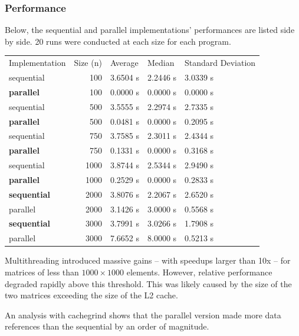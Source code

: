 \documentclass{article}
\begin{document}
\subsubsection{Performance}
Below, the sequential and parallel implementations' performances are
listed side by side. 20 runs were conducted at each size for each program.
\begin{center}
\begin{tabular}{lrlll}
 Implementation  &  Size (n)  &  Average   &  Median    &  Standard Deviation  \\
 sequential       &       100  &  3.6504 s  &  2.2446 s  &  3.0339 s            \\
 \textbf{parallel}       &       100  &  0.0000 s  &  0.0000 s  &  0.0000 s            \\
 sequential       &       500  &  3.5555 s  &  2.2974 s  &  2.7335 s            \\
\textbf{parallel}      &       500  &  0.0481 s  &  0.0000 s  &  0.2095 s            \\
 sequential       &       750  &  3.7585 s  &  2.3011 s  &  2.4344 s            \\
 \textbf{parallel}       &       750  &  0.1331 s  &  0.0000 s  &  0.3168 s            \\
 sequential       &      1000  &  3.8744 s  &  2.5344 s  &  2.9490 s            \\
 \textbf{parallel}       &      1000  &  0.2529 s  &  0.0000 s  &  0.2833 s            \\
 \textbf{sequential}       &      2000  &  3.8076 s  &  2.2067 s  &  2.6520 s            \\
 parallel       &      2000  &  3.1426 s  &  3.0000 s  &  0.5568 s            \\
 \textbf{sequential}       &      3000  &  3.7991 s  &  3.0266 s  &  1.7908 s            \\
 parallel       &      3000  &  7.6652 s  &  8.0000 s  &  0.5213 s            \\
\end{tabular}
\end{center}

Multithreading introduced massive gains -- with speedups larger than
10x -- for matrices of less than $1000 \times 1000$ elements. However, relative
performance degraded rapidly above this threshold. This was likely
caused by the size of the two matrices exceeding the size of the L2
cache. 


An analysis with cachegrind shows that the parallel version made
more data references than the sequential by an order of magnitude.
\end{document}
